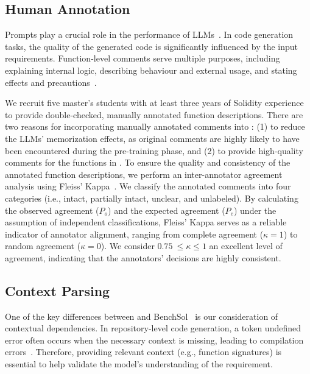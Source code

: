 \subsection{Human Annotation}
Prompts play a crucial role in the performance of LLMs~\cite{jang2023can,sarkar2022like,shrivastava2023repository,zhou2022learning,zhou2022large}. 
In code generation tasks, the quality of the generated code is significantly influenced by the input requirements. 
Function-level comments serve multiple purposes, including explaining internal logic, describing behaviour and external usage, and stating effects and precautions~\cite{yu2024codereval}.


We recruit five master's students with at least three years of Solidity experience to provide double-checked, manually annotated function descriptions. 
There are two reasons for incorporating manually annotated comments into \datasetname: (1) to reduce the LLMs' memorization effects, as original comments are highly likely to have been encountered during the pre-training phase, and (2) to provide high-quality comments for the functions in \datasetname. 
To ensure the quality and consistency of the annotated function descriptions, we perform an inter-annotator agreement analysis using Fleiss' Kappa~\cite{fleiss1971measuring}. We classify the annotated comments into four categories (i.e., intact, partially intact, unclear, and unlabeled). By calculating the observed agreement (\(P_o\)) and the expected agreement (\(P_e\)) under the assumption of independent classifications, Fleiss' Kappa serves as a reliable indicator of annotator alignment, ranging from complete agreement (\(\kappa = 1\)) to random agreement (\(\kappa = 0\)). We consider \(0.75\ \leq \kappa \leq 1\) an excellent level of agreement, indicating that the annotators' decisions are highly consistent.


\subsection{Context Parsing}
One of the key differences between \mytitle and BenchSol~\cite{benchmark2024sol} is our consideration of contextual dependencies. 
In repository-level code generation, a token undefined error often occurs when the necessary context is missing, leading to compilation errors~\cite{A3CodGen}. 
Therefore, providing relevant context (e.g., function signatures) is essential to help \mytitle validate the model's understanding of the requirement.


